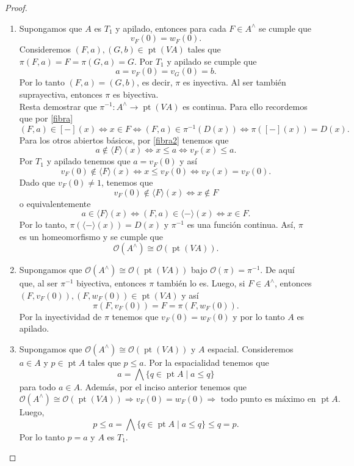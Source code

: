 \documentclass[12pt]{article}
\DeclareMathOperator{\pt}{pt}
\begin{document}
\begin{proof}
  $\mbox{}$
\begin{enumerate}
\item Supongamos que $A$ es $T_1$ y apilado, entonces para cada $F\in A^\wedge$ se cumple que 
\[
v_F(0)=w_F(0).
\]
Consideremos $(F,a), (G,b)\in \pt(VA)$ tales que $\pi(F,a)=F=\pi(G,a)=G$. Por $T_1$ y apilado se cumple que
\[
a=v_F(0)=v_G(0)=b.
\]
Por lo tanto $(F,a)=(G,b)$, es decir, $\pi$ es inyectiva. Al ser también suprayectiva, entonces $\pi$ es biyectiva.\\

Resta demostrar que $\pi^{-1}\colon A^\wedge\to \pt(VA)$ es continua. Para ello recordemos que por \eqref{fibra}
\[
(F,a)\in [-](x)\iff x\in F\iff (F,a)\in \pi^{-1}(D(x))\iff \pi([-](x))=D(x).
\]
Para los otros abiertos básicos, por \eqref{fibra2} tenemos que
\[
a\notin \langle F\rangle(x)\iff x\leq a\iff v_F(x)\leq a.
\]
Por $T_1$ y apilado tenemos que $a=v_F(0)$ y así
\[
v_F(0)\notin \langle F\rangle(x)\iff x\leq v_F(0)\iff v_F(x)=v_F(0).
\]
Dado que $v_F(0)\neq 1$, tenemos que 
\[
v_F(0)\notin \langle F\rangle(x)\iff x\notin F
\]
o equivalentemente 
\[
a\in \langle F\rangle(x)\iff (F, a)\in \langle -\rangle(x)\iff x\in F. 
\]
Por lo tanto, $\pi(\langle -\rangle(x))=D(x)$ y $\pi^{-1}$ es una función continua. Así, $\pi$ es un homeomorfismo y se cumple que
\[
\mathcal{O}(A^\wedge)\cong\mathcal{O}(\pt(VA)).
\]

\item Supongamos que $\mathcal{O}(A^\wedge)\cong\mathcal{O}(\pt(VA))$ bajo $\mathcal{O}(\pi)=\pi^{-1}$. De aquí que, al ser $\pi^{-1}$ biyectiva, entonces $\pi$
también lo es. Luego, si $F\in A^\wedge$, entonces $(F, v_F(0)), (F, w_F(0))\in \pt(VA)$ y así
\[
\pi(F, v_F(0))=F=\pi(F, w_F(0)).
\]
Por la inyectividad de $\pi$ tenemos que $v_F(0)=w_F(0)$ y por lo tanto $A$ es apilado.

\item Supongamos que $\mathcal{O}(A^\wedge)\cong\mathcal{O}(\pt(VA))$ y $A$ espacial. Consideremos $a\in A$ y $p\in \pt A$ tales que $p\leq a$. Por la espacialidad tenemos que 
\[
a=\bigwedge\{q\in \pt A\mid a\leq q\}
\]
para todo $a\in A$. Además, por el inciso anterior tenemos que 
\[
\mathcal{O}(A^\wedge)\cong\mathcal{O}(\pt(VA))\Rightarrow v_F(0)=w_F(0)\Rightarrow \text{ todo punto es máximo en }\pt A.
\]
Luego,
\[
p\leq a=\bigwedge\{q\in \pt A\mid a\leq q\}\leq q=p.
\]
Por lo tanto $p=a$ y $A$ es $T_1$.
\end{enumerate}
\end{proof}
\end{document}
